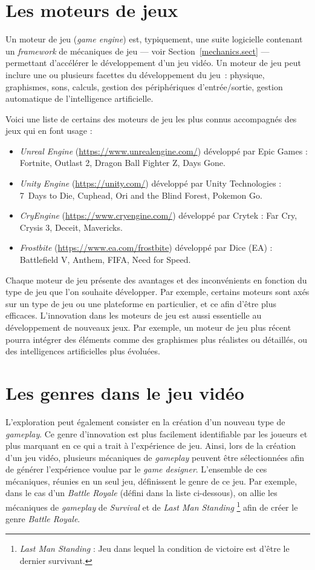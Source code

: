 \section{Les moteurs de jeux}
Un moteur de jeu (\emph{game engine}) est, typiquement, une suite logicielle contenant un \emph{framework} de mécaniques de jeu --- voir Section~\ref{mechanics.sect} --- permettant d'accélérer le développement d'un jeu vidéo.
Un moteur de jeu peut inclure une ou plusieurs facettes du développement du jeu~: physique, graphismes, sons, calculs, gestion des périphériques d'entrée/sortie, gestion automatique de l'intelligence artificielle.

Voici une liste de certains des moteurs de jeu les plus connus accompagnés des jeux qui en font usage : 
\begin{itemize}
    \item \emph{Unreal Engine} (\url{https://www.unrealengine.com/}) développé par Epic Games : Fortnite, Outlast 2, Dragon Ball Fighter Z, Days Gone.
    \item \emph{Unity Engine} (\url{https://unity.com/}) développé par Unity Technologies : 7~Days to Die, Cuphead, Ori and the Blind Forest, Pokemon Go.
    \item \emph{CryEngine} (\url{https://www.cryengine.com/}) développé par Crytek : Far Cry, Crysis 3, Deceit, Mavericks.
    \item \emph{Frostbite} (\url{https://www.ea.com/frostbite}) développé par Dice (EA) : Battlefield V, Anthem, FIFA, Need for Speed.
\end{itemize}

Chaque moteur de jeu présente des avantages et des inconvénients en fonction du type de jeu que l'on souhaite développer.
Par exemple, certains moteurs sont axés sur un type de jeu ou une plateforme en particulier, et ce afin d'être plus efficaces. 
L'innovation dans les moteurs de jeu est aussi essentielle au développement de nouveaux jeux. 
Par exemple, un moteur de jeu plus récent pourra intégrer des éléments comme des graphismes plus réalistes ou détaillés, ou des intelligences artificielles plus évoluées.

\section{Les genres dans le jeu vidéo}
L'exploration peut également consister en la création d'un nouveau type de \emph{gameplay}.
Ce genre d'innovation est plus facilement identifiable par les joueurs et plus marquant en ce qui a trait \`a l'expérience de jeu.
Ainsi, lors de la création d'un jeu vidéo, plusieurs mécaniques de \emph{gameplay} peuvent être sélectionnées afin de générer l'expérience voulue par le \emph{game designer}. L'ensemble de ces mécaniques, réunies en un seul jeu, définissent le genre de ce jeu.
%
Par 
exemple, dans le cas d'un \emph{Battle Royale} (défini dans la liste ci-dessous), on allie les mécaniques de \emph{gameplay} de \emph{Survival} et de \emph{Last Man Standing}
\footnote{\emph{Last Man Standing} : Jeu dans lequel la condition de victoire est d'être le dernier survivant.}
afin de créer le genre \emph{Battle Royale}.

